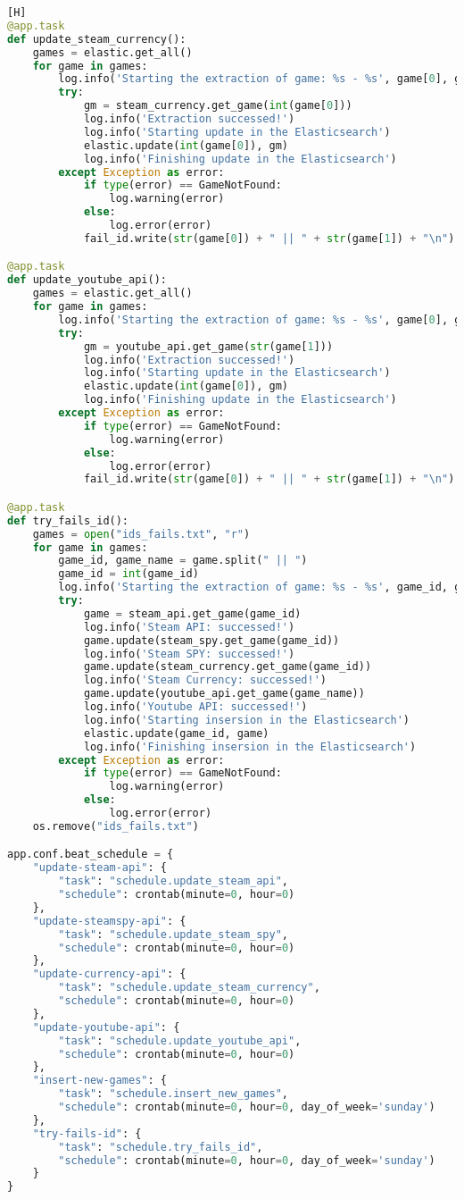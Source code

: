 \begin{lstlisting}[language={Python}, caption = {Código do \textit{\textbf{Schedule}}}, label = {code:schedule}] [H]
@app.task
def update_steam_currency():
	games = elastic.get_all()
	for game in games:
		log.info('Starting the extraction of game: %s - %s', game[0], game[1])
		try:
			gm = steam_currency.get_game(int(game[0]))
			log.info('Extraction successed!')
			log.info('Starting update in the Elasticsearch')
			elastic.update(int(game[0]), gm)
			log.info('Finishing update in the Elasticsearch')
		except Exception as error:
			if type(error) == GameNotFound:
				log.warning(error)
			else:
				log.error(error)
			fail_id.write(str(game[0]) + " || " + str(game[1]) + "\n")

@app.task
def update_youtube_api():
	games = elastic.get_all()
	for game in games:
		log.info('Starting the extraction of game: %s - %s', game[0], game[1])
		try:
			gm = youtube_api.get_game(str(game[1]))
			log.info('Extraction successed!')
			log.info('Starting update in the Elasticsearch')
			elastic.update(int(game[0]), gm)
			log.info('Finishing update in the Elasticsearch')
		except Exception as error:
			if type(error) == GameNotFound:
				log.warning(error)
			else:
				log.error(error)
			fail_id.write(str(game[0]) + " || " + str(game[1]) + "\n")

@app.task
def try_fails_id():
	games = open("ids_fails.txt", "r")
	for game in games:
		game_id, game_name = game.split(" || ")
		game_id = int(game_id)
		log.info('Starting the extraction of game: %s - %s', game_id, game_name)
		try:
			game = steam_api.get_game(game_id)
			log.info('Steam API: successed!')
			game.update(steam_spy.get_game(game_id))
			log.info('Steam SPY: successed!')
			game.update(steam_currency.get_game(game_id))
			log.info('Steam Currency: successed!')
			game.update(youtube_api.get_game(game_name))
			log.info('Youtube API: successed!')
			log.info('Starting insersion in the Elasticsearch')
			elastic.update(game_id, game)
			log.info('Finishing insersion in the Elasticsearch')
		except Exception as error:
			if type(error) == GameNotFound:
				log.warning(error)
			else:
				log.error(error)
	os.remove("ids_fails.txt")

app.conf.beat_schedule = {
	"update-steam-api": {
		"task": "schedule.update_steam_api",
		"schedule": crontab(minute=0, hour=0)
	},
	"update-steamspy-api": {
		"task": "schedule.update_steam_spy",
		"schedule": crontab(minute=0, hour=0)
	},
	"update-currency-api": {
		"task": "schedule.update_steam_currency",
		"schedule": crontab(minute=0, hour=0)
	},
	"update-youtube-api": {
		"task": "schedule.update_youtube_api",
		"schedule": crontab(minute=0, hour=0)
	},
	"insert-new-games": {
		"task": "schedule.insert_new_games",
		"schedule": crontab(minute=0, hour=0, day_of_week='sunday')
	},
	"try-fails-id": {
		"task": "schedule.try_fails_id",
		"schedule": crontab(minute=0, hour=0, day_of_week='sunday')
	}
}
\end{lstlisting}
